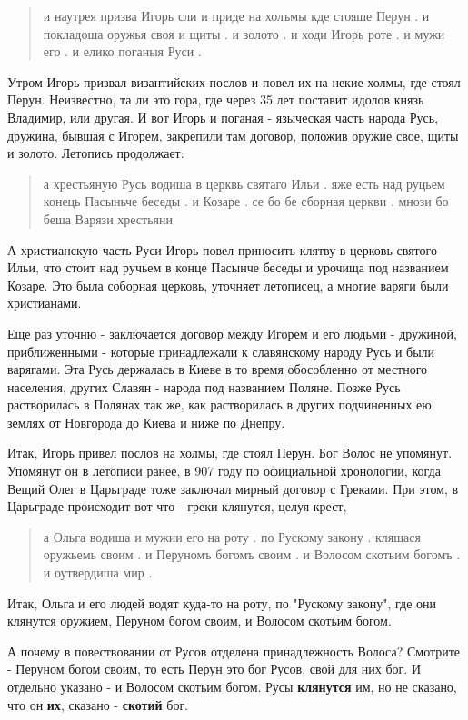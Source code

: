 \documentclass[a5paper,11pt,openany]{article}
\begin{document}
\begin{quotation}
\noindent и наутрея призва Игорь сли и приде на холъмы кде стояше Перун . и покладоша
оружья своя и щиты . и золото . и ходи Игорь роте . и мужи его . и елико поганыя Руси .
\end{quotation} 

Утром Игорь призвал византийских послов и повел их на некие холмы, где стоял Перун. Неизвестно, та ли это гора, где через 35 лет поставит идолов князь Владимир, или другая. И вот Игорь и поганая - языческая часть народа Русь, дружина, бывшая с Игорем, закрепили там договор, положив оружие свое, щиты и золото. 
Летопись продолжает:

\begin{quotation}
\noindent а хрестьяную Русь водиша в церквь святаго Ильи . яже есть над руцьем конець Пасыньче  беседы . и Козаре . се бо бе сборная церкви . мнози бо беша Варязи хрестьяни 
\end{quotation}

А христианскую часть Руси Игорь повел приносить клятву в церковь святого Ильи, что стоит над ручьем в конце Пасынче беседы и урочища под названием Козаре. Это была соборная церковь, уточняет летописец, а многие варяги были христианами.

   Еще раз уточню - заключается договор между Игорем и его людьми - дружиной, приближенными - которые принадлежали к славянскому народу Русь и были варягами. Эта Русь держалась в Киеве в то время обособленно от местного населения, других Славян - народа под названием Поляне. Позже Русь растворилась в Полянах так же, как растворилась в других подчиненных ею землях от Новгорода до Киева и ниже по Днепру.

    Итак, Игорь привел послов на холмы, где стоял Перун. Бог Волос не упомянут. Упомянут он в летописи ранее, в 907 году по официальной хронологии, когда Вещий Олег в Царьграде тоже заключал мирный договор с Греками. При этом, в Царьграде происходит вот что - греки клянутся, целуя крест, 

\begin{quotation}
\noindent а Ольга водиша и мужии его на роту . по Рускому закону . кляшася оружьемь своим . и Перуномъ богомъ своим . и Волосом
скотьим богомъ . и оутвердиша мир .\end{quotation}

Итак, Ольга и его людей водят куда-то на роту, по "Рускому закону", где они клянутся оружием, Перуном богом своим, и Волосом скотьим богом. 

   А почему в повествовании от Русов отделена принадлежность Волоса? Смотрите - Перуном богом своим, то есть Перун это бог Русов, свой для них бог. И отдельно указано - и Волосом скотьим богом. Русы \textbf{клянутся} им, но не сказано, что он \textbf{их}, сказано - \textbf{скотий} бог.
\end{document}
